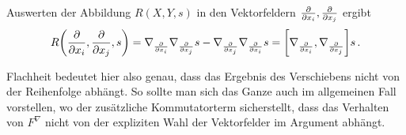 





\begin{bsp}
Auswerten der Abbildung $R(X, Y, s)$ in den Vektorfeldern $\pdv{x_i}, \pdv{x_j}$ ergibt
\begin{equation*}
R\qty(\pdv{x_i}, \pdv{x_j}, s) = \nabla_{\pdv{x_i}} \nabla_{\pdv{x_j}} s - \nabla_{\pdv{x_j}} \nabla_{\pdv{x_i}} s = \qty[\nabla_{\pdv{x_i}}, \nabla_{\pdv{x_j}}] s \, .
\end{equation*}

Flachheit bedeutet hier also genau, dass das Ergebnis des Verschiebens nicht von der Reihenfolge abhängt. So sollte man sich das Ganze auch im allgemeinen Fall vorstellen, wo der zusätzliche Kommutatorterm sicherstellt, dass das Verhalten von $F^\nabla$ nicht von der expliziten Wahl der Vektorfelder im Argument abhängt.
\end{bsp}


\iffalse
\begin{figure}
\centering

\subfloat[Parallelogram im $\mathbb{R}^2$]{\texttt{[image: Bilder/parallelogram\_geschlossen.pdf]}}
\subfloat[Parallelogram auf der 2-Sphäre]{\texttt{[image: Bilder/parallelogram\_ungeschlossen.pdf]}}

\caption[Parallelogramme]{Im Gegensatz zum flachen $\mathbb{R}^n$ ist es in gekrümmten Räumen ist es nicht mehr so, dass sich Parallelogramme gleicher Vektoren schließen.}
\label{fig:parallelograme}
\end{figure}
\fi


